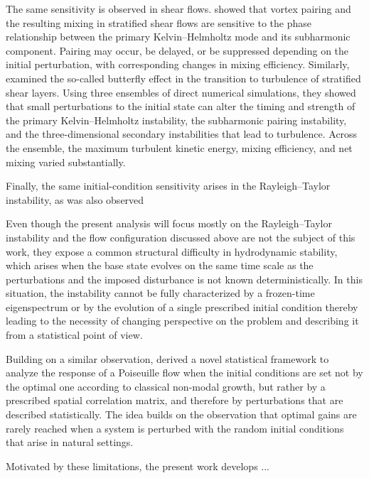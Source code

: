 The same sensitivity is observed in shear flows. \citet{dong-tedford-rahmani-lawrence-2018} showed that vortex pairing and the resulting mixing in stratified shear flows are sensitive to the phase relationship between the primary Kelvin--Helmholtz mode and its subharmonic component. Pairing may occur, be delayed, or be suppressed depending on the initial perturbation, with corresponding changes in mixing efficiency. Similarly, \citet{liu-kaminski-smyth-2022} examined the so-called butterfly effect in the transition to turbulence of stratified shear layers. Using three ensembles of direct numerical simulations, they showed that small perturbations to the initial state can alter the timing and strength of the primary Kelvin--Helmholtz instability, the subharmonic pairing instability, and the three-dimensional secondary instabilities that lead to turbulence. Across the ensemble, the maximum turbulent kinetic energy, mixing efficiency, and net mixing varied substantially.

Finally, the same initial-condition sensitivity arises in the Rayleigh--Taylor instability, as was also observed %

Even though the present analysis will focus mostly on the Rayleigh--Taylor instability and the flow configuration discussed above are not the subject of this work, they expose a common structural difficulty in hydrodynamic stability, which arises when the base state evolves on the same time scale as the perturbations and the imposed disturbance is not known deterministically. In this situation, the instability cannot be fully characterized by a frozen-time eigenspectrum or by the evolution of a single prescribed initial condition thereby leading to the necessity of changing perspective on the problem and describing it from a statistical point of view.

Building on a similar observation, \citet{frame-towne-2024} derived a novel statistical framework to analyze the response of a Poiseuille flow when the initial conditions are set not by the optimal one according to classical non-modal growth, but rather by a prescribed spatial correlation matrix, and therefore by perturbations that are described statistically. The idea builds on the observation that optimal gains are rarely reached when a system is perturbed with the random initial conditions that arise in natural settings.

Motivated by these limitations, the present work develops ...